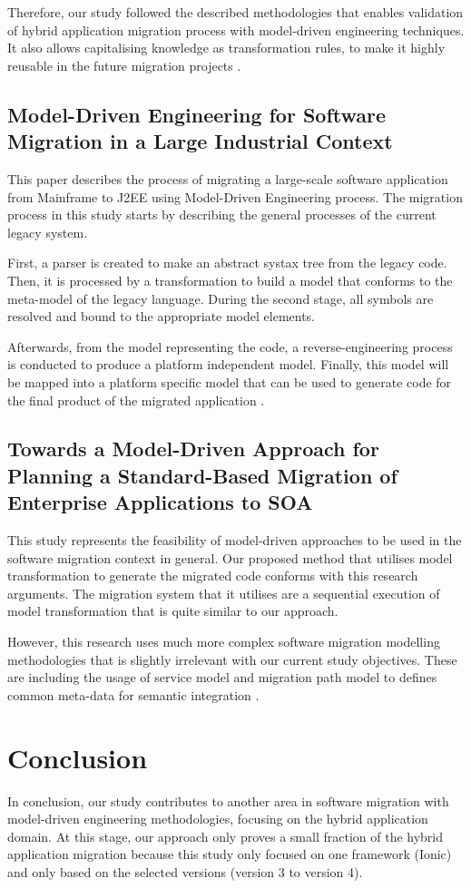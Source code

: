 \documentclass[conference]{IEEEtran}
\begin{document}
Therefore, our study followed the described methodologies that enables validation of 
hybrid application migration process with model-driven engineering techniques. It also allows
capitalising knowledge as transformation rules, to make it highly reusable in the future migration projects
\cite{b3}.

\subsection{ Model-Driven Engineering for Software Migration in a Large Industrial Context }
This paper describes the process of migrating a large-scale software application from Mainframe to J2EE
using Model-Driven Engineering process. The migration process in this study starts by describing the general 
processes of the current legacy system.

First, a parser is created to make an abstract systax tree from the legacy code. Then, it is processed
by a transformation to build a model that conforms to the meta-model of the legacy language.
During the second stage, all symbols are resolved and bound to the appropriate model elements.

Afterwards, from the model representing the code, a reverse-engineering process is conducted to produce a platform independent 
model. Finally, this model will be mapped into a platform specific model that can be used to generate code
for the final product of the migrated application \cite{b5}.

\subsection{ Towards a Model-Driven Approach for Planning a Standard-Based Migration of Enterprise Applications to SOA }
This study represents the feasibility of model-driven approaches to be used in the software migration context in general.
Our proposed method that utilises model transformation to generate the migrated code conforms with this 
research arguments. The migration system that it utilises are a sequential execution of model transformation \cite{b6}
that is quite similar to our approach. 

However, this research uses much more complex software migration modelling 
methodologies that is slightly irrelevant with our current study objectives. These are including
the usage of service model and migration path model to defines common meta-data for semantic integration \cite{b6}.

\section{Conclusion}
In conclusion, our study contributes to another area in software migration with 
model-driven engineering methodologies, focusing on the hybrid application domain.
At this stage, our approach only proves a small fraction of the hybrid application migration because 
this study only focused on one framework (Ionic) and only based on the selected versions (version 3 to version 4).
\end{document}
